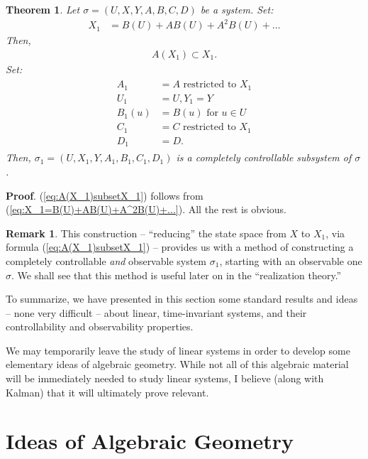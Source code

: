 \documentclass[12pt]{book}
\theoremstyle{plain}
\newtheorem{theorem}{Theorem}[section]
\theoremstyle{definition}
\newtheorem*{remark}{Remark}
\begin{document}
\begin{theorem} \label{thm:CompletelyControllableSubsystem}
    Let $\sigma = (U, X, Y, A, B, C, D)$ be a system.
    Set:
    \begin{align} \label{eq:X_1=B(U)+AB(U)+A^2B(U)+...}
        X_1 &= B(U) + AB(U) + A^2B(U) + \dots
    \end{align}
    Then,
    \begin{align} \label{eq:A(X_1)subsetX_1}
        A(X_1) \subset X_1.
    \end{align}
    Set:
    \begin{align*}
    \begin{split}
        A_1 &= A \text{ restricted to } X_1 \\
        U_1 &= U, Y_1 = Y \\
        B_1(u) &= B(u) \text{ for } u \in U \\
        C_1 &= C \text{ restricted to } X_1 \\
        D_1 &= D.
    \end{split}
    \end{align*}
    Then, $\sigma_1 = (U, X_1, Y, A_1, B_1, C_1, D_1)$ is a completely controllable subsystem of $\sigma$.
\end{theorem}

\textbf{Proof}.
(\ref{eq:A(X_1)subsetX_1}) follows from (\ref{eq:X_1=B(U)+AB(U)+A^2B(U)+...}).
All the rest is obvious.

\begin{remark}
    This construction -- ``reducing'' the state space from $X$ to $X_1$, via formula (\ref{eq:A(X_1)subsetX_1}) -- provides us with a method of constructing a completely controllable \emph{and} observable system $\sigma_1$, starting with an observable one $\sigma$.
    We shall see that this method is useful later on in the ``realization theory.''
\end{remark}

To summarize, we have presented in this section some standard results and ideas -- none very difficult -- about linear, time-invariant systems, and their controllability and observability properties.

We may temporarily leave the study of linear systems in order to develop some elementary ideas of algebraic geometry.
While not all of this algebraic material will be immediately needed to study linear systems, I believe (along with Kalman) that it will ultimately prove relevant.

\chapter{Ideas of Algebraic Geometry}
\end{document}
